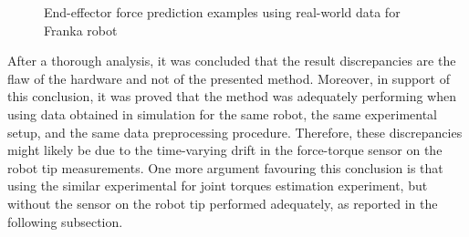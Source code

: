 \begin{figure}
    \vfil
    \hfil
    \caption{End-effector force prediction examples using real-world data for Franka robot}
    \label{fig:RealGraphs}
\end{figure}

After a thorough analysis, it was concluded that the result discrepancies are the flaw of the hardware and not of the presented method. Moreover, in support of this conclusion, it was proved that the method was adequately performing when using data obtained in simulation for the same robot, the same experimental setup, and the same data preprocessing procedure. Therefore, these discrepancies might likely be due to the time-varying drift in the force-torque sensor on the robot tip measurements. One more argument favouring this conclusion is that using the similar experimental for joint torques estimation experiment, but without the sensor on the robot tip performed adequately, as reported in the following subsection.


